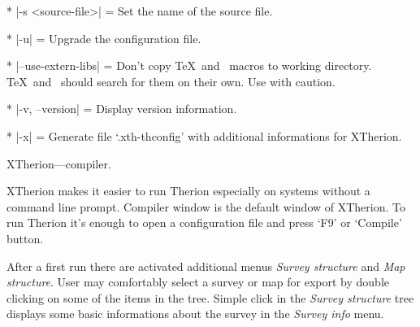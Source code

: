 * |-s <source-file>| =
        Set the name of the source file.
        
* |-u| =
        Upgrade the configuration file.

* |--use-extern-libs| =
  Don't copy \TeX\ and \MP\ macros to working directory. \TeX\ and \MP\ 
  should search for them on their own. Use with caution.

* |-v, --version| =
  Display version information.        
        
* |-x| =
  Generate file `.xth-thconfig' with additional informations for XTherion.
\endoptions

\subsubchapter XTherion---compiler.

XTherion makes it easier to run Therion especially on systems without a command 
line prompt. Compiler window is the default window of XTherion. To run Therion 
it's enough to open a configuration file and press `F9' or `Compile' button. 

After a first run there are activated additional menus {\it Survey 
structure} and {\it Map structure}. User may comfortably select a survey or map 
for export by double clicking on some of the items in the tree. Simple click in 
the {\it Survey structure} tree displays some basic informations about the 
survey in the {\it Survey info} menu.

\endinput
